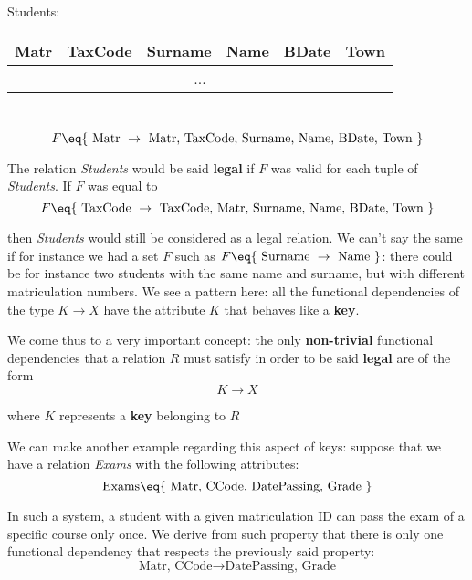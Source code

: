 \begin{center}
    Students: \quad \begin{tabular}{|c|c|c|c|c|c|}
        \hline \rowcolor{maindoccol!60}
        \textbf{Matr} & \textbf{TaxCode} & \textbf{Surname} & \textbf{Name} & \textbf{BDate} & \textbf{Town} \\
        \hline
        \multicolumn{6}{|c|}{...} \\
        \hline
    \end{tabular}
    \\
    \[ F \eq \{ \text{ Matr } \rightarrow \text{ Matr, TaxCode, Surname, Name, BDate, Town } \} \]
\end{center}

The relation \textit{Students} would be said \textbf{legal} if $F$ was valid for each tuple of \textit{Students}. If $F$ was equal to
\[ F \eq \{ \text{ TaxCode } \rightarrow \text{ TaxCode, Matr, Surname, Name, BDate, Town } \} \]

then \textit{Students} would still be considered as a legal relation. We can't say the same if for instance we had a set $F$ such as $F \eq \{ \text{ Surname } \rightarrow \text{ Name } \}$: there could be for instance two students with the same name and surname, but with different matriculation numbers. We see a pattern here: all the functional dependencies of the type $K \rightarrow X$ have the attribute $K$ that behaves like a \textbf{key}.

\begin{question}
    We come thus to a very important concept: the only \textbf{non-trivial} functional dependencies that a relation $R$ must satisfy in order to be said \textbf{legal} are of the form
    \[ K \rightarrow X \]

    where $K$ represents a \textbf{key} belonging to $R$
\end{question}

We can make another example regarding this aspect of keys: suppose that we have a relation \textit{Exams} with the following attributes:
\[ \text{Exams} \eq \{ \text{ Matr, CCode, DatePassing, Grade } \} \]

In such a system, a student with a given matriculation ID can pass the exam of a specific course only once. We derive from such property that there is only one functional dependency that respects the previously said property:
\[ \text{Matr, CCode} \rightarrow \text{DatePassing, Grade} \]

